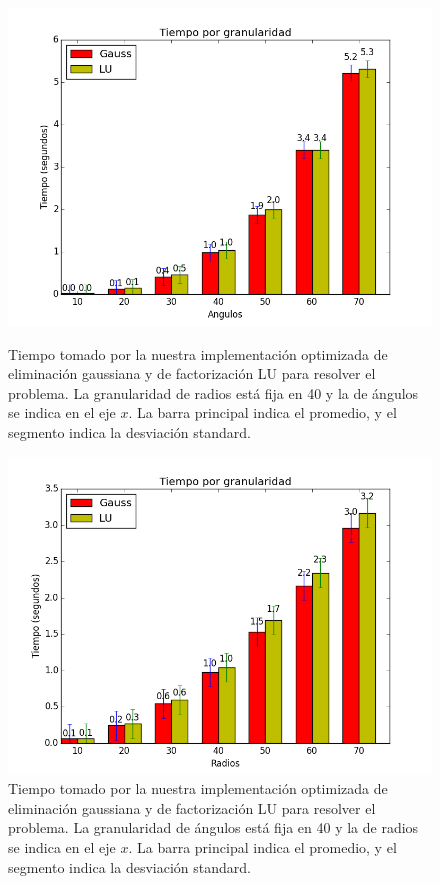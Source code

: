 \begin{figure}[H]
\centering
\begin{minipage}{0.48\textwidth}
  \centering
    \includegraphics[width=1\textwidth]{imgs/tiempos_opt_radios.png}
  \caption{\footnotesize{Tiempo tomado por la nuestra implementación optimizada de eliminación gaussiana y de factorización LU para resolver el problema. La granularidad de radios está fija en 40 y la de ángulos se indica en el eje $x$. La barra principal indica el promedio, y el segmento indica la desviación standard.}}
  \label{fig:tiempoopt1}
\end{minipage}%
\hspace{0.03\textwidth}
\begin{minipage}{0.48\textwidth}   
  \centering
    \includegraphics[width=1\textwidth]{imgs/tiempos_opt_angulos.png} 
  \caption{\footnotesize{Tiempo tomado por la nuestra implementación optimizada de eliminación gaussiana y de factorización LU para resolver el problema. La granularidad de ángulos está fija en 40 y la de radios se indica en el eje $x$. La barra principal indica el promedio, y el segmento indica la desviación standard.}}
  \label{fig:tiempoopt2}
\end{minipage}
\end{figure}


